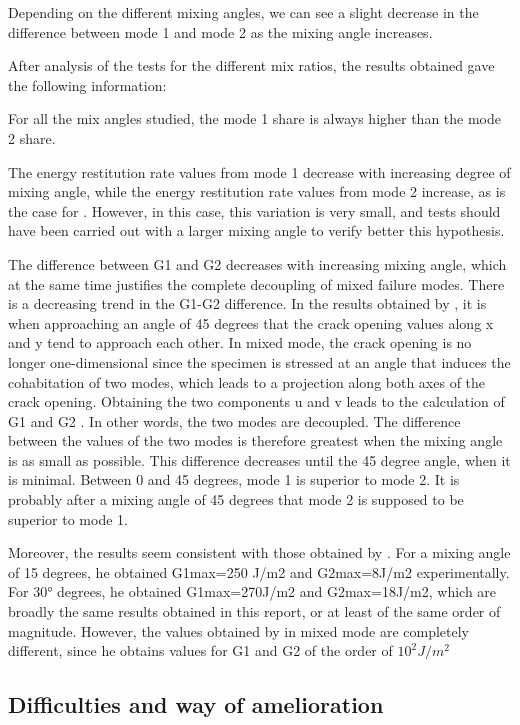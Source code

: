Depending on the different mixing angles, we can see a slight decrease in the difference between mode 1 and mode 2 as the mixing angle increases.

After analysis of the tests for the different mix ratios, the results obtained gave the following information:

For all the mix angles studied, the mode 1 share is always higher than the mode 2 share.

The energy restitution rate values from mode 1 decrease with increasing degree of mixing angle, while the energy restitution rate values from mode 2 increase, as is the case for \cite{Odounga2018phd}. However, in this case, this variation is very small, and tests should have been carried out with a larger mixing angle to verify better this hypothesis.

The difference between G1 and G2 decreases with increasing mixing angle, which at the same time justifies the complete decoupling of mixed failure modes. There is a decreasing trend in the G1-G2 difference. 
In the results obtained by \cite{Odounga2018phd}, it is when approaching an angle of 45 degrees that the crack opening values along x and y tend to approach each other. In mixed mode, the crack opening is no longer one-dimensional since the specimen is stressed at an angle that induces the cohabitation of two modes, which leads to a projection along both axes of the crack opening. Obtaining the two components u and v leads to the calculation of G1 and G2 . In other words, the two modes are decoupled. The difference between the values of the two modes is therefore greatest when the mixing angle is as small as possible. This difference decreases until the 45 degree angle, when it is minimal. Between 0 and 45 degrees, mode 1 is superior to mode 2. It is probably after a mixing angle of 45 degrees that mode 2 is supposed to be superior to mode 1.

Moreover, the results seem consistent with those obtained by \cite{MoutouPitti2008}. For a mixing angle of 15 degrees, he obtained G1max=250 J/m2 and G2max=8J/m2 experimentally. For 30° degrees, he obtained G1max=270J/m2 and G2max=18J/m2, which are broadly the same results obtained in this report, or at least of the same order of magnitude.
However, the values obtained by \cite{Odounga2018phd} in mixed mode are completely different, since he obtains values for G1 and G2 of the order of $10^2 J/m^2$

\subsection{Difficulties and way of amelioration}

